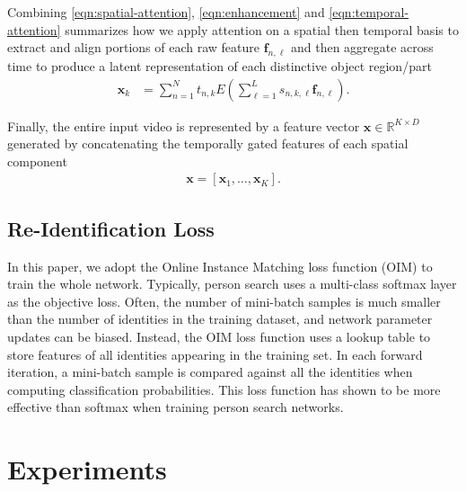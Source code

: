 Combining \eqref{eqn:spatial-attention}, \eqref{eqn:enhancement} and \eqref{eqn:temporal-attention} summarizes how we apply attention on a spatial then temporal basis to extract and align portions of each raw feature $\mathbf{f}_{n,\ell}$ and then aggregate across time to produce a latent representation of each distinctive object region/part  
%
\begin{align}
\mathbf{x}_k &= \sum_{n=1}^N t_{n,k} E\left( \sum_{\ell=1}^L s_{n,k,\ell} \mathbf{f}_{n,\ell} \right).
\end{align}

Finally, the entire input video is represented by a feature vector $\mathbf{x} \in \mathbb{R}^{K \times D}$ generated by concatenating the temporally gated features of each spatial component
%
\begin{align}
    \mathbf{x} = [\mathbf{x}_1, \dots, \mathbf{x}_K].
\end{align}


\subsection{Re-Identification Loss}

In this paper, we adopt the Online Instance Matching loss function (OIM) \cite{xiao2017joint} to train the whole network. 
Typically, person search uses a multi-class softmax layer as the objective loss.  Often, the number of mini-batch samples is much smaller than the number of identities in the training dataset, and network parameter updates can be biased.
Instead, the OIM loss function uses a lookup table to store features of all identities appearing in the training set. 
In each forward iteration, a mini-batch sample is compared against all the identities when computing classification probabilities. 
This loss function has shown to be more effective than softmax when training person search networks.




\section{Experiments}
